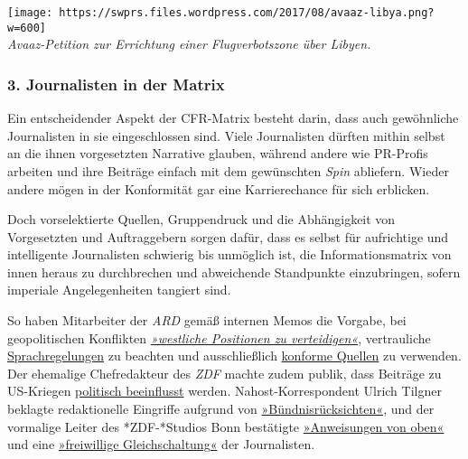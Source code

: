 \texttt{[image: https://swprs.files.wordpress.com/2017/08/avaaz-libya.png?w=600]}\\
\emph{Avaaz-Petition zur Errichtung einer Flugverbotszone über Libyen.}

\hypertarget{3-journalisten-in-der-matrix}{%
\subsubsection{3. Journalisten in der
Matrix}\label{3-journalisten-in-der-matrix}}

Ein entscheidender Aspekt der CFR-Matrix besteht darin, dass auch
gewöhnliche Journalisten in sie eingeschlossen sind. Viele Journalisten
dürften mithin selbst an die ihnen vorgesetzten Narrative glauben,
während andere wie PR-Profis arbeiten und ihre Beiträge einfach mit dem
gewünschten \emph{Spin} abliefern. Wieder andere mögen in der
Konformität gar eine Karrierechance für sich erblicken.

Doch vorselektierte Quellen, Gruppendruck und die Abhängigkeit von
Vorgesetzten und Auftrag­gebern sorgen dafür, dass es selbst für
aufrichtige und intelligente Journalisten schwierig bis unmöglich ist,
die Informations­matrix von innen heraus zu durchbrechen und abweichende
Standpunkte einzubringen, sofern imperiale Angelegenheiten tangiert
sind.

So haben Mitarbeiter der \emph{ARD} gemäß internen Memos die Vorgabe,
bei geopolitischen Konflikten
\href{https://www.heise.de/tp/features/Ukraine-Konflikt-ARD-Programmbeirat-bestaetigt-Publikumskritik-3367400.html}{\emph{»west­liche
Posi­tionen zu ver­tei­di­gen«}}, vertrauliche
\href{https://www.heise.de/tp/features/Die-vertraulichen-Sprachregelungen-der-ARD-3758887.html}{Sprachregelungen}
zu beachten und ausschließlich
\href{https://www.oxmoxhh.de/magazin/story-interview/oxmox-exklusiv-interview-mit-volker-braeutigam-friedhelm-klinkhammer/}{konforme
Quellen} zu verwenden. Der ehemalige Chefredakteur des \emph{ZDF} machte
zudem publik, dass Bei­träge zu US-Kriegen
\href{https://www.youtube.com/watch?v=i2423aDq_hE}{politisch
beeinflusst} werden. Nahost-Korrespondent Ulrich Tilgner be­klagte
re­dak­tio­nelle Ein­­griffe aufgrund von
\href{http://www.berliner-zeitung.de/korrespondent-ulrich-tilgner-sucht-mehr-distanz-zum-zdf--ich-fuehle-mich-eingeschraenkt--15870684}{»Bünd­nis­rück­sich­ten«},
und der vormalige Leiter des *ZDF-*Studios Bonn be­stä­tig­te
\href{https://propagandaschau.wordpress.com/2016/01/30/wolfgang-herles-es-gibt-in-den-oeffentlich-rechtlichen-anweisungen-von-oben/}{»An­wei­sungen
von oben«} und eine
\href{http://www.rolandtichy.de/daili-es-sentials/meinungsfreiheit-anordnung-zur-anpassung/}{»frei­willige
Gleich­­schal­­tung«} der Jour­na­lis­ten.

